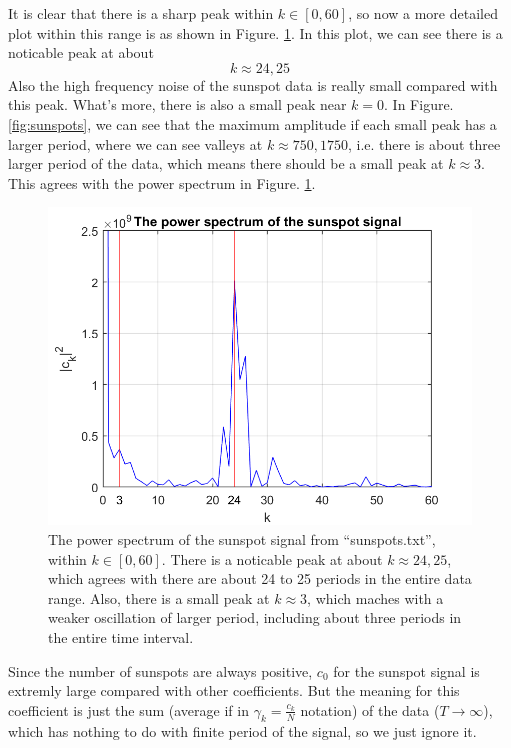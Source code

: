 \documentclass[12pt, graphicx]{article}
\begin{document}
It is clear that there is a sharp peak within $k\in[0,60]$, so now a more detailed plot within this range is as shown in Figure. \ref{fig:dftdetail}. In this plot, we can see there is a noticable peak at about 
\begin{equation}
k\approx24,25
\end{equation}
Also the high frequency noise of the sunspot data is really small compared with this peak. What's more, there is also a small peak near $k=0$. In Figure. \ref{fig:sunspots}, we can see that the maximum amplitude if each small peak has a larger period, where we can see valleys at $k\approx750,1750$, i.e. there is about three larger period of the data, which means there should be a small peak at $k\approx3$. This agrees with the power spectrum in Figure. \ref{fig:dftdetail}.

\begin{figure}[ht]
\centering
\includegraphics[width = 120mm]{powerspectrum_detailed.png}
\caption{The power spectrum of the sunspot signal from \textquotedblleft sunspots.txt\textquotedblright, within $k\in[0,60]$. There is a noticable peak at about $k\approx24,25$, which agrees with there are about 24 to 25 periods in the entire data range. Also, there is a small peak at $k\approx3$, which maches with a weaker oscillation of larger period, including about three periods in the entire time interval.}
\label{fig:dftdetail}
\end{figure}

Since the number of sunspots are always positive, $c_0$ for the sunspot signal is extremly large compared with other coefficients. But the meaning for this coefficient is just the sum (average if in $\gamma_k=\frac{c_k}{N}$ notation) of the data ($T\to\infty$), which has nothing to do with finite period of the signal, so we just ignore it.
\end{document}
